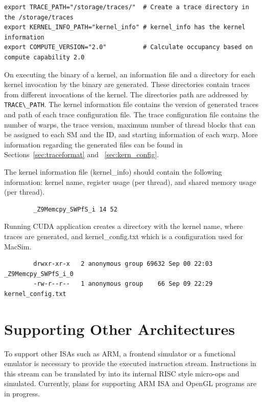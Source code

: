\begin{Verbatim}
export TRACE_PATH="/storage/traces/"  # Create a trace directory in the /storage/traces
export KERNEL_INFO_PATH="kernel_info" # kernel_info has the kernel information
export COMPUTE_VERSION="2.0"          # Calculate occupancy based on compute capability 2.0
\end{Verbatim}

On executing the binary of a kernel, an information file and a directory for each
kernel invocation by the binary are generated. These directories contain traces from 
different invocations of the kernel. The directories path are addressed by \Verb+TRACE\_PATH+. 
The kernel information file contains the version of generated traces and path of
each trace configuration file. The trace configuration file contains the number of warps, the
trace version, maximum number of thread blocks that can be assigned to each SM
and the ID, and starting information of each warp. More information regarding
the generated files can be found in Sections~\ref{sec:traceformat} and ~\ref{sec:kern_config}. 

\ignore
		{
		The kernel information file (kernel\_info) should contain the following
		information: kernel name, register usage (per thread), and shared memory usage
		(per thread).


		\begin{Verbatim}
		_Z9Memcpy_SWPfS_i 14 52 
		\end{Verbatim}


		Running CUDA application creates a directory with the kernel name, where traces 
		are generated, and kernel\_config.txt which is a configuration used for MacSim.


		\begin{Verbatim}
		drwxr-xr-x   2 anonymous group 69632 Sep 00 22:03 _Z9Memcpy_SWPfS_i_0
		-rw-r--r--   1 anonymous group    66 Sep 09 22:29 kernel_config.txt
		\end{Verbatim}
		}


\section{Supporting Other Architectures}

To support other ISAs such as ARM, a frontend simulator or a
functional emulator is necessary to provide the executed instruction stream. 
Instructions in this stream can be translated by \SIM into
its internal RISC style micro-ops and simulated. Currently, plans for
supporting ARM ISA and OpenGL programs are in progress.


